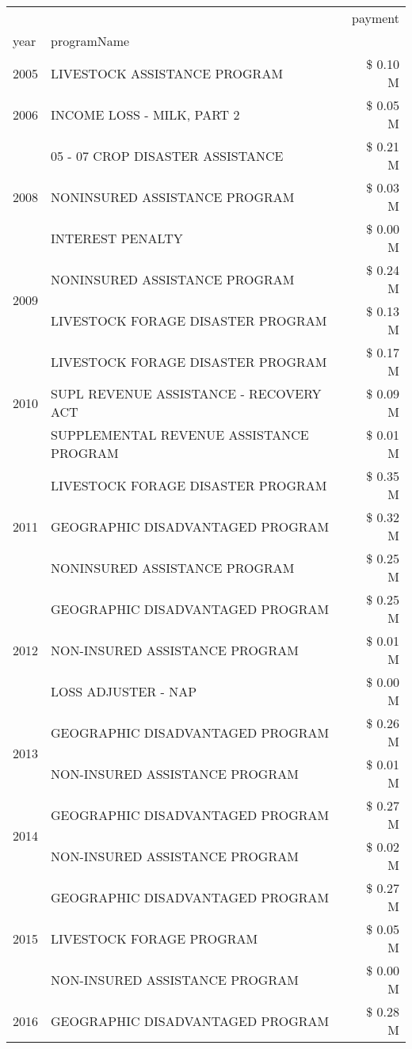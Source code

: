 \begin{tabular}{llr}
\toprule
 &  & payment \\
year & programName &  \\
\midrule
2005 & LIVESTOCK ASSISTANCE PROGRAM & \$ 0.10 M \\
\cline{1-3}
2006 & INCOME LOSS - MILK, PART 2 & \$ 0.05 M \\
\cline{1-3}
\multirow[t]{3}{*}{2008} & 05 - 07 CROP DISASTER ASSISTANCE & \$ 0.21 M \\
 & NONINSURED ASSISTANCE PROGRAM & \$ 0.03 M \\
 & INTEREST PENALTY & \$ 0.00 M \\
\cline{1-3}
\multirow[t]{2}{*}{2009} & NONINSURED ASSISTANCE PROGRAM & \$ 0.24 M \\
 & LIVESTOCK FORAGE DISASTER  PROGRAM & \$ 0.13 M \\
\cline{1-3}
\multirow[t]{3}{*}{2010} & LIVESTOCK FORAGE DISASTER PROGRAM & \$ 0.17 M \\
 & SUPL REVENUE ASSISTANCE - RECOVERY ACT & \$ 0.09 M \\
 & SUPPLEMENTAL REVENUE ASSISTANCE PROGRAM & \$ 0.01 M \\
\cline{1-3}
\multirow[t]{3}{*}{2011} & LIVESTOCK FORAGE DISASTER PROGRAM & \$ 0.35 M \\
 & GEOGRAPHIC DISADVANTAGED PROGRAM & \$ 0.32 M \\
 & NONINSURED ASSISTANCE PROGRAM & \$ 0.25 M \\
\cline{1-3}
\multirow[t]{3}{*}{2012} & GEOGRAPHIC DISADVANTAGED PROGRAM & \$ 0.25 M \\
 & NON-INSURED ASSISTANCE PROGRAM & \$ 0.01 M \\
 & LOSS ADJUSTER - NAP & \$ 0.00 M \\
\cline{1-3}
\multirow[t]{2}{*}{2013} & GEOGRAPHIC DISADVANTAGED PROGRAM & \$ 0.26 M \\
 & NON-INSURED ASSISTANCE PROGRAM & \$ 0.01 M \\
\cline{1-3}
\multirow[t]{2}{*}{2014} & GEOGRAPHIC DISADVANTAGED PROGRAM & \$ 0.27 M \\
 & NON-INSURED ASSISTANCE PROGRAM & \$ 0.02 M \\
\cline{1-3}
\multirow[t]{3}{*}{2015} & GEOGRAPHIC DISADVANTAGED PROGRAM & \$ 0.27 M \\
 & LIVESTOCK FORAGE PROGRAM & \$ 0.05 M \\
 & NON-INSURED ASSISTANCE PROGRAM & \$ 0.00 M \\
\cline{1-3}
2016 & GEOGRAPHIC DISADVANTAGED PROGRAM & \$ 0.28 M \\

\end{tabular}
